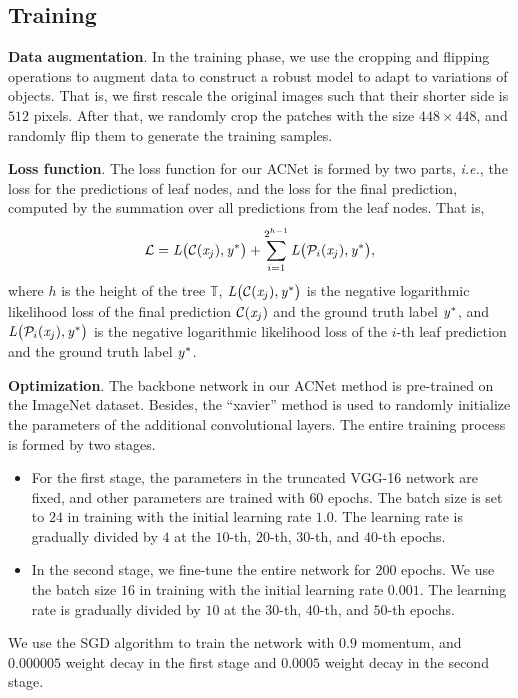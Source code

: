 \documentclass[10pt,twocolumn,letterpaper]{article}
\def\ie{{\em i.e.}}
\begin{document}
\subsection{Training}
{\flushleft \textbf{Data augmentation}.} In the training phase, we use the cropping and flipping operations to augment data to construct a robust model to adapt to variations of objects. That is, we first rescale the original images such that  their shorter side is $512$ pixels. After that, we randomly crop the patches with the size $448\times448$, and randomly flip them to generate the training samples.

{\flushleft \textbf{Loss function}.} The loss function for our ACNet is formed by two parts, \ie, the loss for the predictions of leaf nodes, and the loss for the final prediction, computed by the summation over all predictions from the leaf nodes. That is,
\begin{equation}
{\cal L} = {\it L}\big({\cal C}({\it x}_j), {\it y}^{\ast}\big) + \sum_{i=1}^{2^{h-1}}{\it L}\big({\cal P}_{i}({\it x}_j), {\it y}^{\ast}\big),
\end{equation}
where $h$ is the height of the tree $\mathbb{T}$, ${\it L}\big({\cal C}({\it x}_j), {\it y}^{\ast}\big)$ is the negative logarithmic likelihood loss of the final prediction ${\cal C}({\it x}_j)$ and the ground truth label ${\it y}^{\ast}$, and ${\it L}\big({\cal P}_{i}({\it x}_j), {\it y}^{\ast}\big)$ is the negative logarithmic likelihood loss of the $i$-th leaf prediction and the ground truth label ${\it y}^{\ast}$.

{\flushleft \textbf{Optimization}.}
The backbone network in our ACNet method is pre-trained on the ImageNet dataset. Besides, the ``xavier'' method \cite{DBLP:journals/jmlr/GlorotB10} is used to randomly initialize the parameters of the additional convolutional layers. The entire training process is formed by two stages. 
\begin{itemize}
\item For the first stage, the parameters in the truncated VGG-16 network are fixed, and other parameters are trained with $60$ epochs. The batch size is set to $24$ in training with the initial learning rate $1.0$. The learning rate is gradually divided by $4$ at the $10$-th, $20$-th, $30$-th, and $40$-th epochs. 
\item In the second stage, we fine-tune the entire network for $200$ epochs. We use the batch size $16$ in training with the initial learning rate $0.001$. The learning rate is gradually divided by $10$ at the $30$-th, $40$-th, and $50$-th epochs. 
\end{itemize}
We use the SGD algorithm to train the network with $0.9$ momentum, and $0.000005$ weight decay in the first stage and $0.0005$ weight decay in the second stage.
\end{document}
